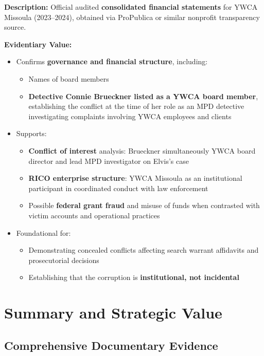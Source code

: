 \documentclass[11pt, letterpaper]{article}
\begin{document}
\textbf{Description:} Official audited \textbf{consolidated financial statements} for YWCA Missoula (2023--2024), obtained via ProPublica or similar nonprofit transparency source.

\textbf{Evidentiary Value:}

\begin{itemize}[leftmargin=*]
  \item Confirms \textbf{governance and financial structure}, including:
    \begin{itemize}
      \item Names of board members
      \item \textbf{Detective Connie Brueckner listed as a YWCA board member}, establishing the conflict at the time of her role as an MPD detective investigating complaints involving YWCA employees and clients
    \end{itemize}
  \item Supports:
    \begin{itemize}
      \item \textbf{Conflict of interest} analysis: Brueckner simultaneously YWCA board director and lead MPD investigator on Elvis's case
      \item \textbf{RICO enterprise structure}: YWCA Missoula as an institutional participant in coordinated conduct with law enforcement
      \item Possible \textbf{federal grant fraud} and misuse of funds when contrasted with victim accounts and operational practices
    \end{itemize}
  \item Foundational for:
    \begin{itemize}
      \item Demonstrating concealed conflicts affecting search warrant affidavits and prosecutorial decisions
      \item Establishing that the corruption is \textbf{institutional, not incidental}
    \end{itemize}
\end{itemize}

\newpage

\section{Summary and Strategic Value}

\subsection{Comprehensive Documentary Evidence}
\end{document}
